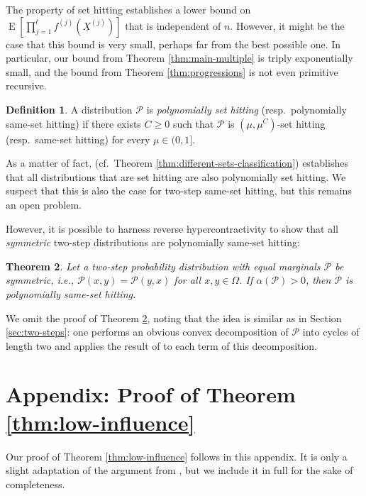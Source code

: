 \documentclass{daj}
\newcommand{\1}{\mathbbm{1}}
\theoremstyle{plain}
\newtheorem{theorem}{Theorem}[section]
\theoremstyle{definition}
\newtheorem{definition}[theorem]{Definition}
\DeclareMathOperator*{\EE}{E}
\begin{document}
The property of set hitting establishes a lower bound on
$\EE\left[ \prod_{j=1}^\ell f^{(j)}(\underline{X}^{(j)})\right]$ that is
independent of $n$. However, it might be the case that this bound is very
small, perhaps far from the best possible one. In particular, our bound
from Theorem \ref{thm:main-multiple} is triply exponentially small, and
the bound from Theorem \ref{thm:progressions} is not even primitive recursive.

\begin{definition}
A distribution $\mathcal{P}$ is \emph{polynomially set hitting}
(resp.~polynomially same-set hitting) if there exists $C \ge 0$
such that $\mathcal{P}$ is $(\mu, \mu^C)$-set hitting (resp.~same-set hitting)
for every $\mu \in (0, 1]$.
\end{definition}

As a matter of fact, \cite{MOS13} 
(cf.~Theorem \ref{thm:different-sets-classification}) establishes that
all distributions that are set hitting are also polynomially set hitting.
We suspect that this is also the case for two-step same-set hitting,
but this remains an open problem.

However, it is possible to harness reverse hypercontractivity to show
that all \emph{symmetric} two-step distributions are polynomially same-set
hitting:
\begin{theorem}
\label{thm:symmetric}
Let a two-step probability distribution with equal marginals 
$\mathcal{P}$ be symmetric, i.e.,
$\mathcal{P}(x, y) = \mathcal{P}(y, x)$ for all $x, y \in \Omega$.
If $\alpha(\mathcal{P}) > 0$, then $\mathcal{P}$ is polynomially same-set
hitting.
\end{theorem}

We omit the proof of Theorem \ref{thm:symmetric}, 
noting that the idea is similar as in Section \ref{sec:two-steps}:
one performs an obvious convex decomposition of $\mathcal{P}$ into cycles
of length two and applies
the result of \cite{MOS13} to each term of this decomposition.

\appendix \section{Appendix: Proof of Theorem \ref{thm:low-influence}}
\label{sec:low-influence-proof}

Our proof of Theorem \ref{thm:low-influence} follows in this appendix. 
It is only a slight adaptation of the argument from \cite{Mos10}, but
we include it in full for the sake of completeness.
\end{document}

